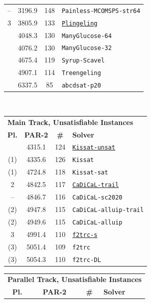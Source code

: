 \documentclass{elsarticle}
\newcommand{\solver}[1]{\texttt{#1}}
\newcommand{\solbert}[1]{\underline{\solver{#1}}}
\begin{document}
\begin{table}
\begin{tabularx}{.5\linewidth}{cccX}
-- & 3196.9 & 148 & \solver{Painless-MCOMSPS-str64} \\
 3 & 3805.9 & 133 & \solbert{Plingeling} \\
   & 4048.3 & 130 & \solver{ManyGlucose-64} \\
   & 4076.2 & 130 & \solver{ManyGlucose-32} \\
   & 4675.4 & 119 & \solver{Syrup-Scavel} \\
   & 4907.1 & 114 & \solver{Treengeling} \\
   & 6337.5 & \phantom{0}85 & \solver{abcdsat-p20} \\
\end{tabularx}
~\\[1em]
\begin{tabularx}{.47\linewidth}{cccX}
\multicolumn{4}{l}{\bf Main Track, Unsatisfiable Instances}\\
\bf Pl. & \bf PAR-2 & \bf \# & \bf Solver \\
\arrayrulecolor{lightgray}\hline   
1     & 4315.1 & 124 & \solbert{Kissat-unsat} \\
(1)   & 4335.6 & 126 & \solver{Kissat} \\
(1)   & 4724.8 & 118 & \solver{Kissat-sat} \\
 2    & 4842.5 & 117 & \solbert{CaDiCaL-trail} \\
--    & 4846.7 & 116 & \solver{CaDiCaL-sc2020} \\
(2)   & 4947.8 & 115 & \solver{CaDiCaL-alluip-trail} \\
(2)   & 4949.6 & 115 & \solver{CaDiCaL-alluip} \\
 3    & 4991.4 & 110 & \solbert{f2trc-s} \\
(3)   & 5051.4 & 109 & \solver{f2trc} \\
(3)   & 5054.3 & 110 & \solver{f2trc-DL}%
\end{tabularx}\quad%
\begin{tabularx}{.5\linewidth}{cccX}
\multicolumn{4}{l}{\bf Parallel Track, Unsatisfiable Instances}\\
\bf Pl. & \bf PAR-2 & \bf \# & \bf Solver \\

\end{tabularx}
\end{table}
\end{document}
